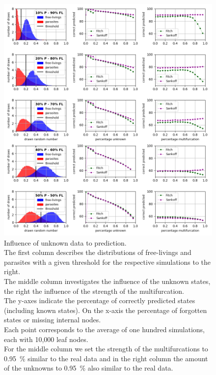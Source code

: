     \begin{figure}
      \centering
      \includegraphics[trim = 0mm 0mm 0mm 150mm, clip, width=\textwidth]{Figures/simulation_evaluation_1.png}
      \caption{Influence of unknown data to prediction. \\
        The first column describes the distributions of free-livings and parasites with a given 
          threshold for the respective simulations to the right. \\
        The middle column investigates the influence of the unknown states, the right the influence of
          the strength of the multifurcation. \\
        The y-axes indicate the percentage of correctly predicted states (including known states). On 
          the x-axis the percentage of forgotten states or missing internal nodes. \\
        Each point corresponds to the average of one hundred simulations, each with 10,000 leaf nodes. \\
        For the middle column we set the strength of the multifurcations to 0.95~\% similar to the 
          real data and in the right column the amount of the unknowns to 0.95~\% also similar to the 
          real data.}
      \label{fig:influence of unknown data}
    \end{figure}
